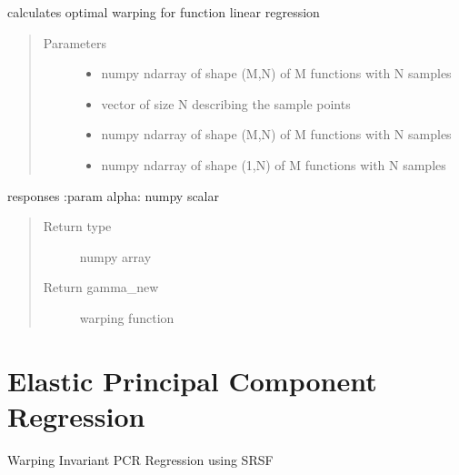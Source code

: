 \documentclass[letterpaper,10pt,english]{sphinxmanual}
\begin{document}
\begin{fulllineitems}
\label{\detokenize{regression:regression.regression_warp}}
calculates optimal warping for function linear regression
\begin{quote}\begin{description}
\item[{Parameters}] \leavevmode\begin{itemize}
\item {} 
 \textendash{} numpy ndarray of shape (M,N) of M functions with N samples

\item {} 
 \textendash{} vector of size N describing the sample points

\item {} 
 \textendash{} numpy ndarray of shape (M,N) of M functions with N samples

\item {} 
 \textendash{} numpy ndarray of shape (1,N) of M functions with N samples

\end{itemize}

\end{description}\end{quote}

responses
:param alpha: numpy scalar
\begin{quote}\begin{description}
\item[{Return type}] \leavevmode
numpy array

\item[{Return gamma\_new}] \leavevmode
warping function

\end{description}\end{quote}

\end{fulllineitems}



\chapter{Elastic Principal Component Regression}
\label{\detokenize{pcr_regression:module-pcr_regression}}\label{\detokenize{pcr_regression:elastic-principal-component-regression}}\label{\detokenize{pcr_regression::doc}}
Warping Invariant PCR Regression using SRSF
\end{document}
